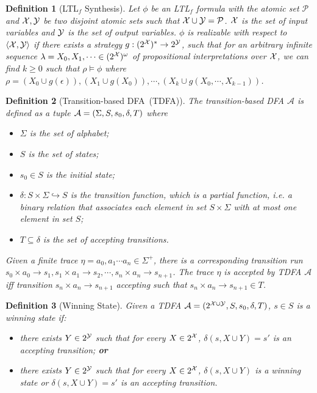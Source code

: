 \documentclass[10pt]{article}
\newtheorem{myDefinition}{Definition}
\renewcommand{\LTLf}{LTL$_f$\xspace}
\renewcommand{\P}{\mathcal{P}}
\begin{document}
\maketitle
\Large
\begin{myDefinition}[\LTLf Synthesis]
Let $\phi$ be an \LTLf formula with the atomic set $\P$ and $\mathcal{X},\mathcal{Y}$ be two disjoint atomic sets such that $\X\cup \Y= \P$. $\mathcal{X}$ is the set of input variables and $\mathcal{Y}$ is the set of output variables. $\phi$ is realizable with respect to $\langle \mathcal{X},\mathcal{Y}\rangle$ if there exists a strategy $g: (2^{\mathcal{X}})^* \to 2^{\mathcal{Y}}$, such that for an arbitrary infinite sequence $\lambda = X_0, X_1, \cdots \in (2^{\mathcal{X}})^\omega$ of propositional interpretations over $\mathcal{X}$, we can find $k \geq 0$ such that $\rho\models\phi$ where $\rho=(X_0\cup g(\epsilon)),(X_1\cup g(X_0)),\cdots,(X_k\cup g(X_0,\cdots,X_{k-1}))$. 
\end{myDefinition}

\begin{myDefinition}[Transition-based DFA~(TDFA)]
The transition-based DFA $\mathcal{A}$ is defined as a tuple $\mathcal{A} = (\Sigma,S,s_0,\delta,T)$ where
\begin{itemize}
    \item $\Sigma$ is the set of alphabet;
    \item $S$ is the set of states;
    \item $s_0\in S$ is the initial state;
    \item $\delta:S\times\Sigma\hookrightarrow S$ is the transition function, which is a partial function, i.e. a binary relation that associates each element in set $S\times \Sigma$ with at most one element in set $S$;
    \item $T \subseteq \delta$ is the set of accepting transitions.
\end{itemize}
Given a finite trace  $\eta=a_0, a_1\cdots a_n \in \Sigma^+$, there is a corresponding transition run $s_0\times a_0\to s_1,s_1\times a_1\to s_2,\cdots,s_n\times a_n\to s_{n+1}$. The trace $\eta$ is accepted by TDFA $\mathcal{A}$ iff transition $s_n \times a_n\to s_{n+1}$ accepting such that $s_n \times a_n\to s_{n+1}\in T$.
\end{myDefinition}

\begin{myDefinition}[Winning State]
\label{def:win_st}
Given a TDFA $\mathcal{A} =(2^{\mathcal{X}\cup \mathcal{Y}},S,s_0,\delta,T)$, $s\in S$ is a winning state if:
\begin{itemize}
    \item there exists $Y \in 2^{\mathcal{Y}}$ such that for every $X \in 2^{\mathcal{X}}$, $\delta(s,X\cup Y)=s'$ is an accepting transition; \textbf{or}
    \item there exists $Y \in 2^{\mathcal{Y}}$ such that for every $X \in 2^{\mathcal{X}}$, $\delta(s,X\cup Y)$ is a winning state or $\delta(s, X\cup Y)=s'$ is an accepting transition.
\end{itemize}
\end{myDefinition}
\end{document}
